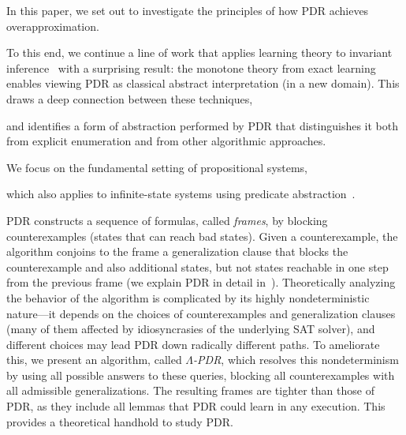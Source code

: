 \documentclass[acmsmall,screen]{acmart}
\begin{document}
\begin{changebar}
In this paper, we set out to investigate the principles of how PDR achieves overapproximation.
\end{changebar}
To this end, we continue a line of work that applies learning theory to invariant inference~\cite[e.g.][]{ICELearning,DBLP:journals/jar/NeiderMSGP20,DBLP:journals/pacmpl/EzudheenND0M18,DBLP:conf/icse/JhaGST10,DBLP:conf/popl/0001NMR16,DBLP:conf/sas/0001GHAN13,DBLP:conf/cav/SharmaNA12,DBLP:conf/esop/0001GHALN13,DBLP:journals/fmsd/SharmaA16,DBLP:conf/pldi/KoenigPIA20,DBLP:journals/acta/JhaS17,DBLP:journals/pacmpl/FeldmanISS20,DBLP:journals/pacmpl/FeldmanSSW21} with a surprising result: the monotone theory from exact learning~\cite{DBLP:journals/iandc/Bshouty95} enables viewing PDR as classical abstract interpretation (in a new domain). This draws a deep connection between these techniques,
\begin{changebar}
and identifies a form of abstraction performed by PDR that distinguishes it both from explicit enumeration and from other algorithmic approaches. %
\end{changebar}
%
%
%
%
%

We focus on the fundamental setting of propositional systems,
\begin{changebar}
which also applies to infinite-state systems using predicate abstraction~\cite{DBLP:conf/popl/FlanaganQ02,DBLP:conf/cav/GrafS97}.
\end{changebar}
PDR constructs a sequence of formulas, called \emph{frames}, by blocking counterexamples (states that can reach bad states). 
Given a counterexample, the algorithm conjoins to the frame a generalization clause that blocks the counterexample and also additional states, but not states reachable in one step from the previous frame (we explain PDR in detail in~).
%
Theoretically analyzing the behavior of the algorithm is complicated by its highly nondeterministic nature---it depends on the choices of counterexamples and generalization clauses (many of them affected by idiosyncrasies of the underlying SAT solver), and different choices may lead PDR down radically different paths.
%
To ameliorate this, 
%
%
%
we present an algorithm, called \emph{$\Lambda$-PDR}, which resolves this nondeterminism by using all possible answers to these queries, blocking all counterexamples with all admissible generalizations. The resulting frames are tighter than those of PDR, as they include all lemmas that PDR could learn in any execution. This provides a theoretical handhold to study PDR.
%
\end{document}
